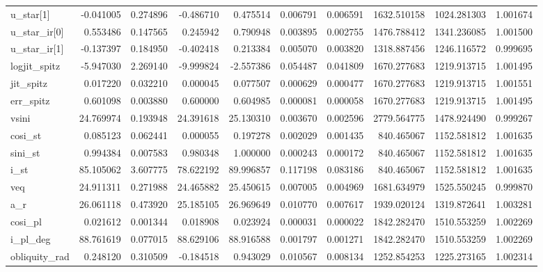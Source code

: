 \begin{tabular}{lrrrrrrrrr}
u\_star[1]     &   -0.041005 &   0.274896 &   -0.486710 &    0.475514 &   0.006791 &  0.006591 &  1632.510158 &  1024.281303 &  1.001674 \\
u\_star\_ir[0]  &    0.553486 &   0.147565 &    0.245942 &    0.790948 &   0.003895 &  0.002755 &  1476.788412 &  1341.236085 &  1.001500 \\
u\_star\_ir[1]  &   -0.137397 &   0.184950 &   -0.402418 &    0.213384 &   0.005070 &  0.003820 &  1318.887456 &  1246.116572 &  0.999695 \\
logjit\_spitz  &   -5.947030 &   2.269140 &   -9.999824 &   -2.557386 &   0.054487 &  0.041809 &  1670.277683 &  1219.913715 &  1.001495 \\
jit\_spitz     &    0.017220 &   0.032210 &    0.000045 &    0.077507 &   0.000629 &  0.000477 &  1670.277683 &  1219.913715 &  1.001551 \\
err\_spitz     &    0.601098 &   0.003880 &    0.600000 &    0.604985 &   0.000081 &  0.000058 &  1670.277683 &  1219.913715 &  1.001495 \\
vsini         &   24.769974 &   0.193948 &   24.391618 &   25.130310 &   0.003670 &  0.002596 &  2779.564775 &  1478.924490 &  0.999267 \\
cosi\_st       &    0.085123 &   0.062441 &    0.000055 &    0.197278 &   0.002029 &  0.001435 &   840.465067 &  1152.581812 &  1.001635 \\
sini\_st       &    0.994384 &   0.007583 &    0.980348 &    1.000000 &   0.000243 &  0.000172 &   840.465067 &  1152.581812 &  1.001635 \\
i\_st          &   85.105062 &   3.607775 &   78.622192 &   89.996857 &   0.117198 &  0.083186 &   840.465067 &  1152.581812 &  1.001635 \\
veq           &   24.911311 &   0.271988 &   24.465882 &   25.450615 &   0.007005 &  0.004969 &  1681.634979 &  1525.550245 &  0.999870 \\
a\_r           &   26.061118 &   0.473920 &   25.185105 &   26.969649 &   0.010770 &  0.007617 &  1939.020124 &  1319.872641 &  1.003281 \\
cosi\_pl       &    0.021612 &   0.001344 &    0.018908 &    0.023924 &   0.000031 &  0.000022 &  1842.282470 &  1510.553259 &  1.002269 \\
i\_pl\_deg      &   88.761619 &   0.077015 &   88.629106 &   88.916588 &   0.001797 &  0.001271 &  1842.282470 &  1510.553259 &  1.002269 \\
obliquity\_rad &    0.248120 &   0.310509 &   -0.184518 &    0.943029 &   0.010567 &  0.008134 &  1252.854253 &  1225.273165 &  1.002314 \\

\end{tabular}
